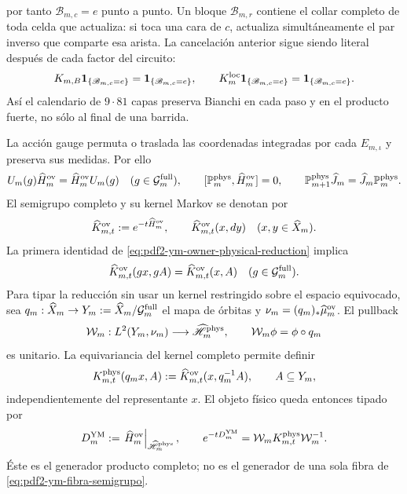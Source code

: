por tanto $\mathscr B_{m,c}=e$ punto a punto. Un bloque
$\mathcal B_{m,r}$ contiene el collar completo de toda celda que actualiza: si toca
una cara de $c$, actualiza simultáneamente el par inverso que comparte esa arista.
La cancelación anterior sigue siendo literal después de cada factor del circuito:
\begin{equation}\label{eq:pdf2-ym-owner-bianchi-block-invariance}
 K_{m,B}\mathbf1_{\{\mathscr B_{m,c}=e\}}
 =\mathbf1_{\{\mathscr B_{m,c}=e\}},
 \qquad
 K_m^{\rm loc}\mathbf1_{\{\mathscr B_{m,c}=e\}}
 =\mathbf1_{\{\mathscr B_{m,c}=e\}}.
\end{equation}
Así el calendario de $9\cdot81$ capas preserva Bianchi en cada paso y en el producto
fuerte, no sólo al final de una barrida.

La acción gauge permuta o traslada las coordenadas integradas por cada
$E_{m,\iota}$ y
preserva sus medidas. Por ello
\begin{equation}\label{eq:pdf2-ym-owner-physical-reduction}
 U_m(g)\widehat H_m^{\rm ov}=\widehat H_m^{\rm ov}U_m(g)
 \quad(g\in\mathcal G_m^{\rm full}),
 \qquad
 [\mathbb P_m^{\rm phys},\widehat H_m^{\rm ov}]=0,
 \qquad
 \mathbb P_{m+1}^{\rm phys}\widehat J_m
 =\widehat J_m\mathbb P_m^{\rm phys}.
\end{equation}
El semigrupo completo y su kernel Markov se denotan por
\begin{equation}\label{eq:pdf2-ym-owner-full-kernel}
 \widehat K_{m,t}^{\rm ov}:=e^{-t\widehat H_m^{\rm ov}},
 \qquad
\widehat K_{m,t}^{\rm ov}(x,dy)
 \quad(x,y\in\widehat X_m).
\end{equation}
La primera identidad de \eqref{eq:pdf2-ym-owner-physical-reduction} implica
\begin{equation}\label{eq:pdf2-ym-owner-full-kernel-equivariance}
 \widehat K_{m,t}^{\rm ov}(gx,gA)
 =\widehat K_{m,t}^{\rm ov}(x,A)
 \quad(g\in\mathcal G_m^{\rm full}).
\end{equation}
Para tipar la reducción sin usar un kernel restringido sobre el espacio equivocado,
sea $q_m:\widehat X_m\to Y_m:=\widehat X_m/\mathcal G_m^{\rm full}$ el mapa de
órbitas y $\nu_m=(q_m)_*\widehat\mu_m^{\rm ov}$. El pullback
\begin{equation}\label{eq:pdf2-ym-owner-quotient-unitary}
 \mathcal W_m:L^2(Y_m,\nu_m)\longrightarrow
 \widehat{\mathscr H}_m^{\rm phys},
 \qquad \mathcal W_m\phi=\phi\circ q_m
\end{equation}
es unitario. La equivariancia del kernel completo permite definir
\begin{equation}\label{eq:pdf2-ym-owner-physical-kernel}
 K_{m,t}^{\rm phys}(q_mx,A)
 :=\widehat K_{m,t}^{\rm ov}(x,q_m^{-1}A),
 \qquad A\subseteq Y_m,
\end{equation}
independientemente del representante $x$. El objeto físico queda entonces tipado por
\begin{equation}\label{eq:pdf2-ym-owner-D}
 D_m^{\rm YM}
 :=\left.\widehat H_m^{\rm ov}\right|_{\widehat{\mathscr H}_m^{\rm phys}},
 \qquad
 e^{-tD_m^{\rm YM}}
 =\mathcal W_mK_{m,t}^{\rm phys}\mathcal W_m^{-1}.
\end{equation}
Éste es el generador producto completo; no es el generador de una sola fibra de
\eqref{eq:pdf2-ym-fibra-semigrupo}.

